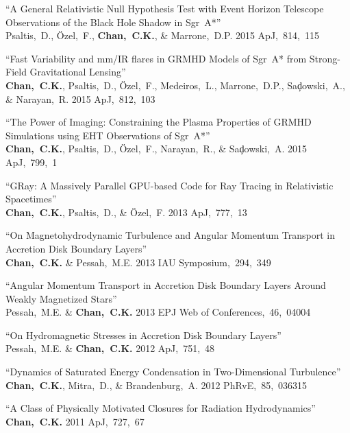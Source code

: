 \begin{ilist}
\item ``A General Relativistic Null Hypothesis Test with Event Horizon Telescope Observations of the Black Hole Shadow in Sgr~A*''\\
  Psaltis,~D., {\"O}zel,~F., \textbf{Chan,~C.K.}, \& Marrone,~D.P.
  2015 ApJ,~814,~115

\item ``Fast Variability and mm/IR flares in GRMHD Models of Sgr~A* from Strong-Field Gravitational Lensing''\\
  \textbf{Chan,~C.K.}, Psaltis,~D., {\"O}zel,~F., Medeiros,~L., Marrone,~D.P., Sa{\c d}owski,~A., \& Narayan,~R.
  2015 ApJ,~812,~103

\item ``The Power of Imaging: Constraining the Plasma Properties of GRMHD Simulations using EHT Observations of Sgr~A*''\\
  \textbf{Chan,~C.K.}, Psaltis,~D., {\"O}zel,~F., Narayan,~R., \& Sa{\c d}owski,~A.
  2015 ApJ,~799,~1

\item ``GRay: A Massively Parallel GPU-based Code for Ray Tracing in Relativistic Spacetimes''\\
  \textbf{Chan,~C.K.}, Psaltis,~D., \& {\"O}zel,~F.
  2013 ApJ,~777,~13

\item ``On Magnetohydrodynamic Turbulence and Angular Momentum Transport in Accretion Disk Boundary Layers''\\
  \textbf{Chan,~C.K.} \& Pessah,~M.E.
  2013 IAU Symposium,~294,~349

\item ``Angular Momentum Transport in Accretion Disk Boundary Layers Around Weakly Magnetized Stars''\\
  Pessah,~M.E. \& \textbf{Chan,~C.K.}
  2013  EPJ Web of Conferences,~46,~04004

\item ``On Hydromagnetic Stresses in Accretion Disk Boundary Layers''\\
  Pessah,~M.E. \& \textbf{Chan,~C.K.}
  2012 ApJ,~751,~48

\item ``Dynamics of Saturated Energy Condensation in Two-Dimensional Turbulence''\\
  \textbf{Chan,~C.K.}, Mitra,~D., \& Brandenburg,~A.
  2012 PhRvE,~85,~036315

\item ``A Class of Physically Motivated Closures for Radiation Hydrodynamics''\\
  \textbf{Chan,~C.K.}
  2011 ApJ,~727,~67


\end{ilist}
